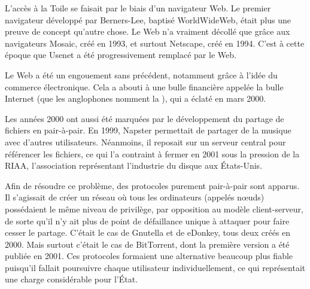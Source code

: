 L'accès à la Toile se faisait par le biais d'un navigateur Web. Le premier navigateur développé par Berners-Lee, baptisé WorldWideWeb, était plus une preuve de concept qu'autre chose. Le Web n'a vraiment décollé que grâce aux navigateurs Mosaic, créé en 1993, et surtout Netscape, créé en 1994. C'est à cette époque que Usenet a été progressivement remplacé par le Web.

Le Web a été un engouement sans précédent, notamment grâce à l'idée du commerce électronique. Cela a abouti à une bulle financière appelée la bulle Internet (que les anglophones nomment la ), qui a éclaté en mars 2000. %

Les années 2000 ont aussi été marquées par le développement du partage de fichiers en pair-à-pair. En 1999, Napster permettait de partager de la musique avec d'autres utilisateurs. Néanmoins, il reposait sur un serveur central pour référencer les fichiers, ce qui l'a contraint à fermer en 2001 sous la pression de la RIAA, l'association représentant l'industrie du disque aux États-Unis.

Afin de résoudre ce problème, des protocoles purement pair-à-pair sont apparus. Il s'agissait de créer un réseau où tous les ordinateurs (appelés nœuds) possédaient le même niveau de privilège, par opposition au modèle client-serveur, de sorte qu'il n'y ait plus de point de défaillance unique à attaquer pour faire cesser le partage. C'était le cas de Gnutella et de eDonkey, tous deux créés en 2000. Mais surtout c'était le cas de BitTorrent, dont la première version a été publiée en 2001. Ces protocoles formaient une alternative beaucoup plus fiable puisqu'il fallait poursuivre chaque utilisateur individuellement, ce qui représentait une charge considérable pour l'État.


